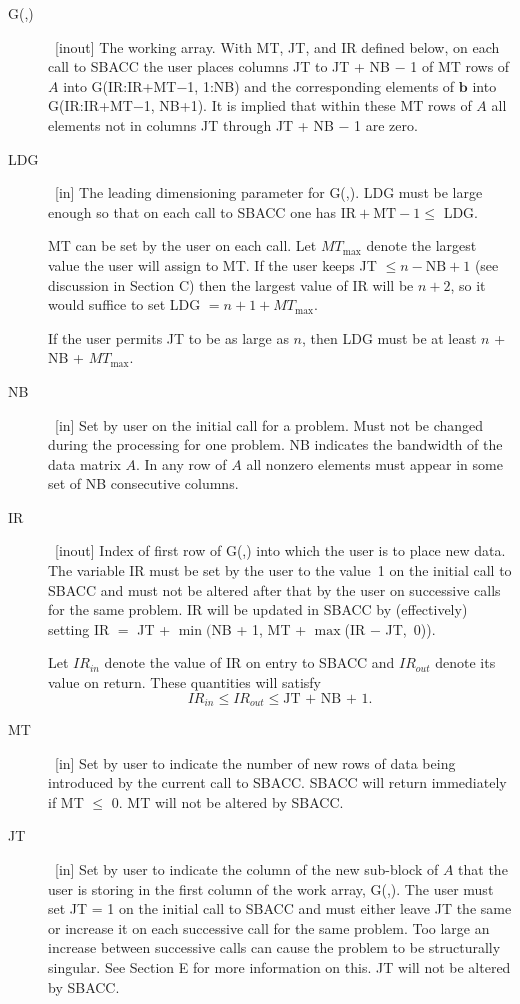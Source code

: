\documentclass[twoside]{MATH77}
\begin{document}
\begin{description}
\item[G(,)] \ [inout] The working array.  With MT, JT, and IR defined below,
  on each call to SBACC the user places columns JT to JT + NB $-$ 1 of MT rows
  of $A$ into G(IR:IR+MT$-$1, 1:NB) and the corresponding elements of
  $\mathbf{b}$ into G(IR:IR+MT$-$1, NB+1).  It is implied that within these MT
  rows of $A$ all elements not in columns JT through JT + NB $-$ 1 are zero.

\item[LDG]  \ [in] The leading dimensioning parameter for G(,). LDG must be
large enough so that on each call to SBACC one has $\text{IR}+\text{MT}-1\leq $
LDG.

MT can be set by the user on each call. Let $MT_{\max }$ denote the largest
value the user will assign to MT. If the user keeps JT $\leq n-\text{NB} +
1$ (see discussion in Section C) then the largest value of IR will be $n+2$,
so it would suffice to set LDG $=n+1+MT_{\max }.$

If the user permits JT to be as large as $n$, then LDG must be at least $n$
+ NB + $MT_{\max }.$

\item[NB]  \ [in] Set by user on the initial call for a problem. Must not be
changed during the processing for one problem. NB indicates the bandwidth of
the data matrix $A$. In any row of $A$ all nonzero elements must appear
in some set of NB consecutive columns.

\item[IR]  \ [inout] Index of first row of G(,) into which the user is to
place new data. The variable IR must be set by the user to the value~1 on
the initial call to SBACC and must not be altered after that by the user on
successive calls for the same problem. IR will be updated in SBACC by
(effectively) setting IR $=$ JT + $\min ($NB + 1, MT + $\max $(IR $-$ JT,~0)).

Let $IR_{in}$ denote the value of IR on entry to SBACC and $IR_{out}$ denote
its value on return. These quantities will satisfy%
\begin{equation*}
IR_{in}\leq IR_{out}\leq \text{JT + NB + 1}.
\end{equation*}
\item[MT]  \ [in] Set by user to indicate the number of new rows of data
being introduced by the current call to SBACC. SBACC will return immediately
if MT $\leq $ 0. MT will not be altered by SBACC.

\item[JT]  \ [in] Set by user to indicate the column of the new sub-block of
$A$ that the user is storing in the first column of the work array, G(,).
The user must set JT = 1 on the initial call to SBACC and must either leave
JT the same or increase it on each successive call for the same problem. Too
large an increase between successive calls can cause the problem to be
structurally singular. See Section E for more information on this. JT will not
be altered by SBACC.


\end{description}
\end{document}
